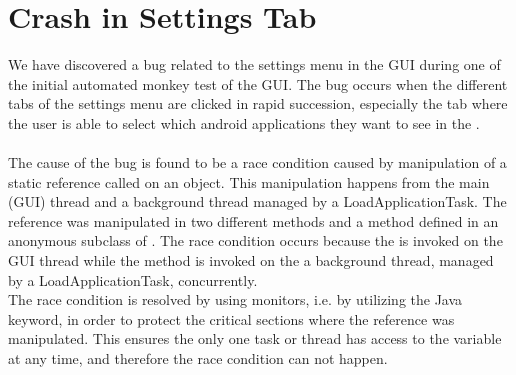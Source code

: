 \section{Crash in Settings Tab}
\label{sec:crash_in_settings_tab}

We have discovered a bug related to the settings menu in the \launcher GUI during one of the initial automated monkey test of the GUI. The bug occurs when the different tabs of the settings menu are clicked in rapid succession, especially the tab where the user is able to select which android applications they want to see in the \giraf \launcher.
\\\\
The cause of the bug is found to be a race condition caused by manipulation of a static reference called  on an  object. This manipulation happens from the main (GUI) thread and a background thread managed by a LoadApplicationTask. The reference was manipulated in two different methods  and a method  defined in an anonymous subclass of . The race condition occurs because the  is invoked on the GUI thread while the  method is invoked on the a background thread, managed by a LoadApplicationTask, concurrently. \\

The race condition is resolved by using monitors, i.e. by utilizing the  Java keyword, in order to protect the critical sections where the  reference was manipulated. This ensures the only one task or thread has access to the variable at any time, and therefore the race condition can not happen.



